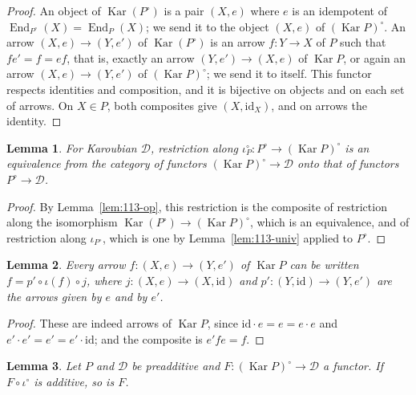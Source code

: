 \documentclass[11pt]{article}
\theoremstyle{plain}
\newtheorem{lemme}{Lemma}[section]
\theoremstyle{definition}
\theoremstyle{remark}
\begin{document}
\begin{proof}
An object of $\operatorname{Kar}(P^\circ)$ is a pair $(X, e)$ where $e$ is an idempotent of $\operatorname{End}_{P^\circ}(X) = \operatorname{End}_P(X)$; we send it to the object $(X, e)$ of $(\operatorname{Kar} P)^\circ$. An arrow $(X, e) \to (Y, e')$ of $\operatorname{Kar}(P^\circ)$ is an arrow $f : Y \to X$ of $P$ such that $f e' = f = e f$, that is, exactly an arrow $(Y, e') \to (X, e)$ of $\operatorname{Kar} P$, or again an arrow $(X, e) \to (Y, e')$ of $(\operatorname{Kar} P)^\circ$; we send it to itself. This functor respects identities and composition, and it is bijective on objects and on each set of arrows. On $X \in P$, both composites give $(X, \mathrm{id}_X)$, and on arrows the identity.
\end{proof}

\begin{lemme}\label{lem:113-restr}
For Karoubian $\mathcal D$, restriction along $\iota_P^\circ : P^\circ \to (\operatorname{Kar} P)^\circ$ is an equivalence from the category of functors $(\operatorname{Kar} P)^\circ \to \mathcal D$ onto that of functors $P^\circ \to \mathcal D$.
\end{lemme}

\begin{proof}
By Lemma~\ref{lem:113-op}, this restriction is the composite of restriction along the isomorphism $\operatorname{Kar}(P^\circ) \to (\operatorname{Kar} P)^\circ$, which is an equivalence, and of restriction along $\iota_{P^\circ}$, which is one by Lemma~\ref{lem:113-univ} applied to $P^\circ$.
\end{proof}

\begin{lemme}\label{lem:113-decomp}
Every arrow $f : (X, e) \to (Y, e')$ of $\operatorname{Kar} P$ can be written $f = p' \circ \iota(f) \circ j$, where $j : (X, e) \to (X, \mathrm{id})$ and $p' : (Y, \mathrm{id}) \to (Y, e')$ are the arrows given by $e$ and by $e'$.
\end{lemme}

\begin{proof}
These are indeed arrows of $\operatorname{Kar} P$, since $\mathrm{id} \cdot e = e = e \cdot e$ and $e' \cdot e' = e' = e' \cdot \mathrm{id}$; and the composite is $e' f e = f$.
\end{proof}

\begin{lemme}\label{lem:113-add}
Let $P$ and $\mathcal D$ be preadditive and $F : (\operatorname{Kar} P)^\circ \to \mathcal D$ a functor. If $F \circ \iota^\circ$ is additive, so is $F$.
\end{lemme}
\end{document}

